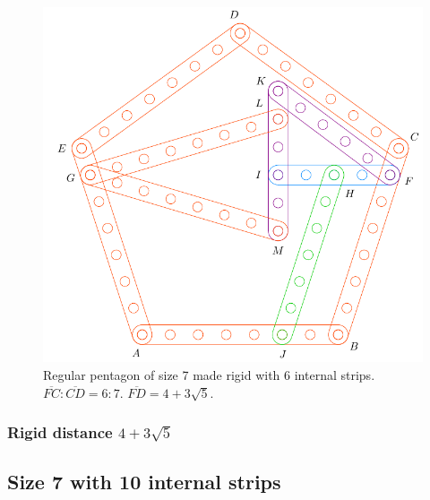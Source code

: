 \documentclass[11pt]{article}
\begin{document}
\begin{figure}[H]
\centering
\includegraphics[scale=0.7]{7/penta7-6a}
\caption{Regular pentagon of size 7 made rigid with 6 internal strips. $\overline{FC} : \overline{CD} = 6:7$. $\overline{FD} = 4 + 3\sqrt5$.}
\label{fig:penta7-6a}
\end{figure}

\subsubsection{Rigid distance $4 + 3\sqrt5$}


\subsection{Size 7 with 10 internal strips}
\end{document}
